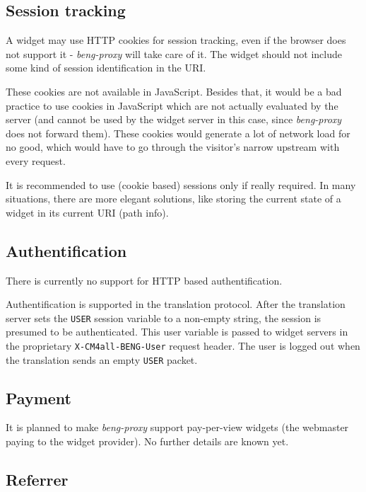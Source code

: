 \documentclass[a4paper,12pt]{article}
\begin{document}
\subsection{Session tracking}

A widget may use HTTP cookies for session tracking, even if the
browser does not support it - \emph{beng-proxy} will take care of it.
The widget should not include some kind of session identification in
the URI.

These cookies are not available in JavaScript.  Besides that, it would
be a bad practice to use cookies in JavaScript which are not actually
evaluated by the server (and cannot be used by the widget server in
this case, since \emph{beng-proxy} does not forward them).  These
cookies would generate a lot of network load for no good, which would
have to go through the visitor's narrow upstream with every request.

It is recommended to use (cookie based) sessions only if really
required.  In many situations, there are more elegant solutions, like
storing the current state of a widget in its current URI (path info).

\subsection{Authentification}

There is currently no support for HTTP based authentification.

Authentification is supported in the translation protocol.  After the
translation server sets the \texttt{USER} session variable to a
non-empty string, the session is presumed to be authenticated.  This
user variable is passed to widget servers in the proprietary
\texttt{X-CM4all-BENG-User} request header.  The user is logged out
when the translation sends an empty \texttt{USER} packet.



\subsection{Payment}

It is planned to make \emph{beng-proxy} support pay-per-view widgets
(the webmaster paying to the widget provider).  No further details are
known yet.


\subsection{Referrer}
\end{document}
